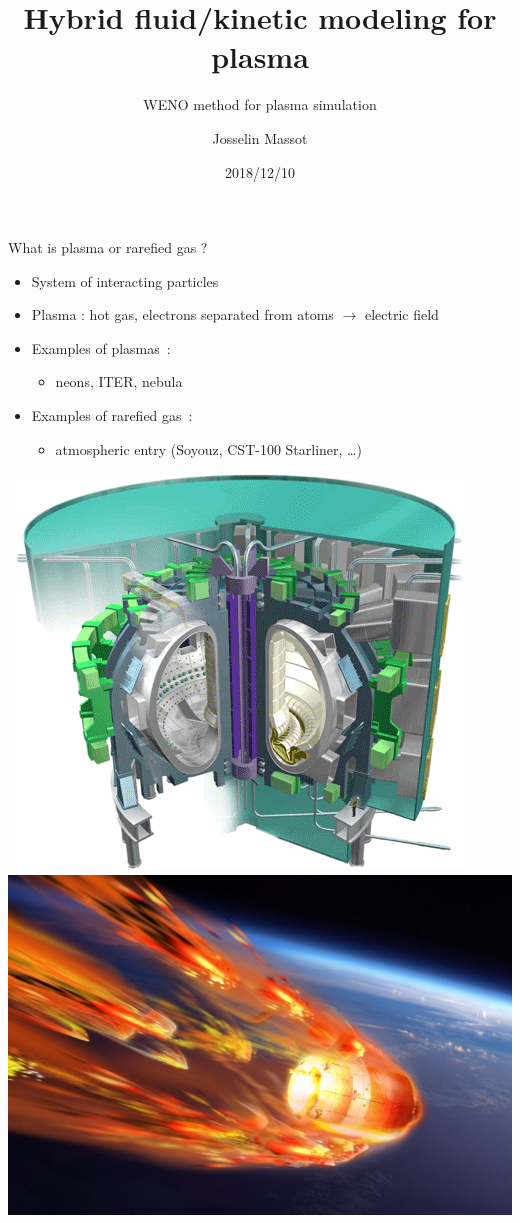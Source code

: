 \documentclass{beamer}
\title[]{Hybrid fluid/kinetic modeling for plasma}
\subtitle{WENO method for plasma simulation}
\author{Josselin Massot}
\date{2018/12/10}
\begin{document}
  \begin{frame}[plain,t]
    \titlepage
  \end{frame}

  \begin{frame}{What is plasma or rarefied gas ?}
    \begin{itemize}
      \item System of interacting particles
      \item Plasma : hot gas, electrons separated from atoms $\rightarrow$ electric field
      \item Examples of plasmas~:
        \begin{itemize}
          \item neons, ITER, nebula
        \end{itemize}
      \item Examples of rarefied gas~:
        \begin{itemize}
          \item atmospheric entry (Soyouz, CST-100 Starliner, \dots)
        \end{itemize}
    \end{itemize}
    \ \hfill \includegraphics[height=0.3\textheight]{img/tokamak.png} \hfill \includegraphics[height=0.3\textheight]{img/space.png} \hfill \ 
  \end{frame}
\end{document}
